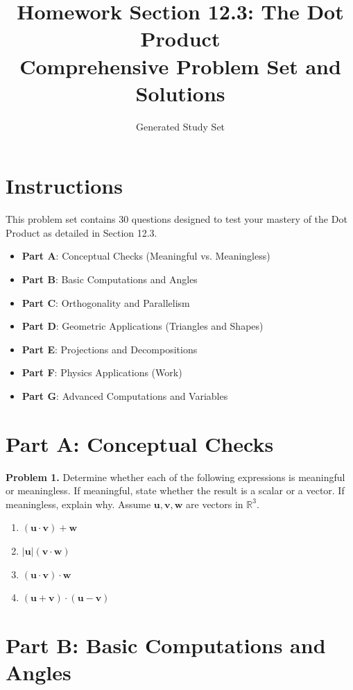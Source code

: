 \documentclass[12pt]{article}
\title{Homework Section 12.3: The Dot Product\\ \large Comprehensive Problem Set and Solutions}
\author{Generated Study Set}
\date{}
\begin{document}
\maketitle

\section*{Instructions}
This problem set contains 30 questions designed to test your mastery of the Dot Product as detailed in Section 12.3. 
\begin{itemize}
    \item \textbf{Part A}: Conceptual Checks (Meaningful vs. Meaningless)
    \item \textbf{Part B}: Basic Computations and Angles
    \item \textbf{Part C}: Orthogonality and Parallelism
    \item \textbf{Part D}: Geometric Applications (Triangles and Shapes)
    \item \textbf{Part E}: Projections and Decompositions
    \item \textbf{Part F}: Physics Applications (Work)
    \item \textbf{Part G}: Advanced Computations and Variables
\end{itemize}

\hrulefill

\section*{Part A: Conceptual Checks}

\textbf{Problem 1.} Determine whether each of the following expressions is meaningful or meaningless. If meaningful, state whether the result is a scalar or a vector. If meaningless, explain why. Assume $\mathbf{u}, \mathbf{v}, \mathbf{w}$ are vectors in $\mathbb{R}^3$.
\begin{enumerate}[label=(\alph*)]
    \item $(\mathbf{u} \cdot \mathbf{v}) + \mathbf{w}$
    \item $|\mathbf{u}|(\mathbf{v} \cdot \mathbf{w})$
    \item $(\mathbf{u} \cdot \mathbf{v}) \cdot \mathbf{w}$
    \item $(\mathbf{u} + \mathbf{v}) \cdot (\mathbf{u} - \mathbf{v})$
\end{enumerate}

\section*{Part B: Basic Computations and Angles}
\end{document}
